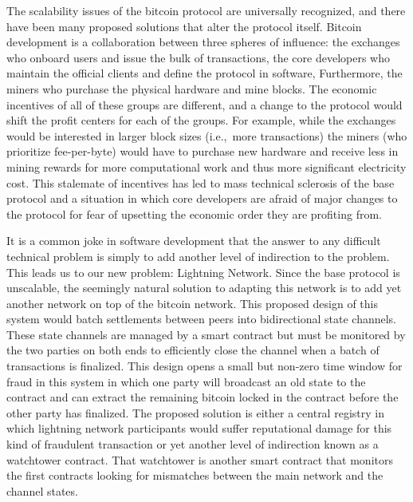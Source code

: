 
The scalability issues of the bitcoin protocol are universally recognized, and
there have been many proposed solutions that alter the protocol itself.
\cite{hinzen2019proof} Bitcoin development is a collaboration between three
spheres of influence: the exchanges who onboard users and issue the bulk of
transactions, the core developers who maintain the official clients and define
the protocol in software, Furthermore, the miners who purchase the physical
hardware and mine blocks. The economic incentives of all of these groups are
different, and a change to the protocol would shift the profit centers for each
of the groups. For example, while the exchanges would be interested in larger
block sizes (i.e., more transactions) the miners (who prioritize fee-per-byte)
would have to purchase new hardware and receive less in mining rewards for more
computational work and thus more significant electricity cost. This stalemate of
incentives has led to mass technical sclerosis of the base protocol and a
situation in which core developers are afraid of major changes to the protocol
for fear of upsetting the economic order they are profiting from.


It is a common joke in software development that the answer to any difficult
technical problem is simply to add another level of indirection to the problem.
This leads us to our new problem: Lightning Network. Since the base protocol is
unscalable, the seemingly natural solution to adapting this network is to add
yet another network on top of the bitcoin network. This proposed design of this
system would batch settlements between peers into bidirectional state channels.
These state channels are managed by a smart contract but must be monitored by
the two parties on both ends to efficiently close the channel when a batch of
transactions is finalized. This design opens a small but non-zero time window
for fraud in this system in which one party will broadcast an old state to the
contract and can extract the remaining bitcoin locked in the contract before the
other party has finalized. The proposed solution is either a central registry in
which lightning network participants would suffer reputational damage for this
kind of fraudulent transaction or yet another level of indirection known as a
watchtower contract. That watchtower is another smart contract that monitors the
first contracts looking for mismatches between the main network and the channel
states.

